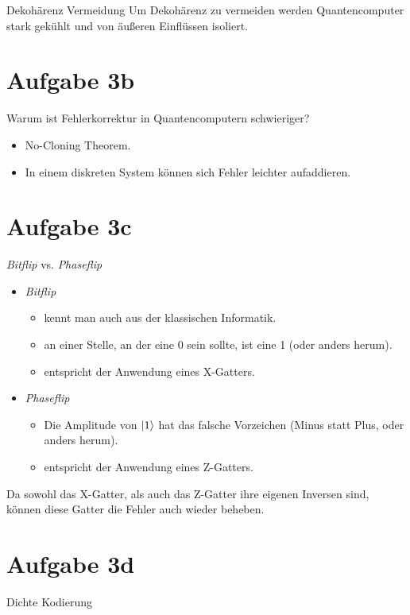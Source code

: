 \documentclass[fleqn,compress,utf8,aspectratio=169,t]{beamer}
\begin{document}
\begin{frame}{Dekohärenz Vermeidung}
Um Dekohärenz zu vermeiden werden Quantencomputer stark gekühlt und von äußeren Einflüssen isoliert.
\end{frame}

\section{Aufgabe 3b}

\begin{frame}{Warum ist Fehlerkorrektur in Quantencomputern schwieriger?}
\begin{itemize}
	\item No-Cloning Theorem.
	\item In einem diskreten System können sich Fehler leichter aufaddieren.
\end{itemize}
\end{frame}

\section{Aufgabe 3c}

\begin{frame}{\textit{Bitflip} vs. \textit{Phaseflip}}
\begin{itemize}
	\item \textit{Bitflip}
	\begin{itemize}
		\item kennt man auch aus der klassischen Informatik.
		\item an einer Stelle, an der eine 0 sein sollte, ist eine 1 (oder anders herum).
		\item entspricht der Anwendung eines X-Gatters.
	\end{itemize}
	\item \textit{Phaseflip}
	\begin{itemize}
		\item Die Amplitude von $\ket{1}$ hat das falsche Vorzeichen (Minus statt Plus, oder anders herum).
		\item entspricht der Anwendung eines Z-Gatters.
	\end{itemize}
\end{itemize}
Da sowohl das X-Gatter, als auch das Z-Gatter ihre eigenen Inversen sind, können diese Gatter die Fehler auch wieder beheben.
\end{frame}

\section{Aufgabe 3d}

\begin{frame}{Dichte Kodierung}
\end{frame}
\end{document}
